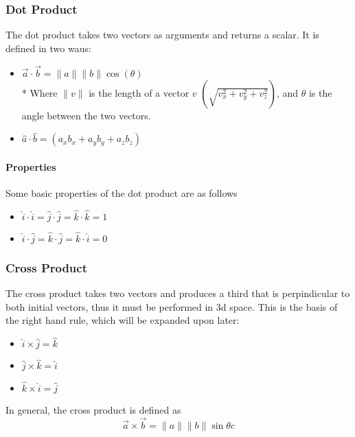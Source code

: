 \documentclass[a4paper,12pt]{article}
\begin{document}
				\subsubsection{Dot Product}
					The dot product takes two vectors as arguments and returns a scalar. It is defined in two waus:
					\begin{itemize}
							\item $\vec{a} \cdot \vec{b} = \|a\|\|b\|\cos(\theta)$\\*
									Where $\|v\|$ is the length of a vector $v$  $\left( \sqrt{v_{x}^{2} + v_{y}^{2} + v_{z}^{2}}\right)$, and $\theta$ is the angle between the two vectors.
							\item $\hat{a} \cdot \hat{b} = (a_{x}b_{x} + a_{y}b_{y} + a_{z}b_{z})$ 
					\end{itemize}
					\paragraph{Properties}
					Some basic properties of the dot product are as follows
					\begin{itemize}
							\item $\hat{i} \cdot \hat{i} = \hat{j} \cdot \hat{j} = \hat{k} \cdot \hat{k} = 1$
							\item $\hat{i} \cdot \hat{j}=\hat{k} \cdot \hat{j}=\hat{k} \cdot \hat{i} = 0$ 
					\end{itemize}
				\subsubsection{Cross Product}
				The cross product takes two vectors and produces a third that is perpindicular to both initial vectors, thus it must be performed in 3d space. This is the basis of the right hand rule, which will be expanded upon later:
				\begin{itemize}
						\item $\hat{i} \times \hat{j}=\hat{k}$
						\item $\hat{j} \times \hat{k}=\hat{i}$
						\item $\hat{k} \times \hat{i}=\hat{j}$
				\end{itemize}
				
				In general, the cross product is defined as
				\begin{equation*}
						\vec{a} \times \vec{b} = \|a\|\|b\|\sin{\theta}c
				\end{equation*}
\end{document}
